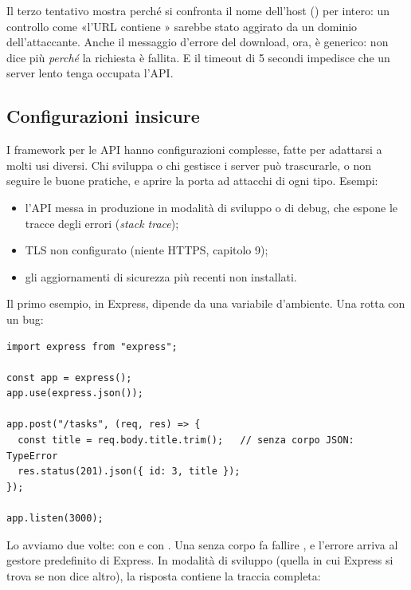 Il terzo tentativo mostra perché si confronta il nome dell'host
() per intero: un controllo come «l'URL contiene
» sarebbe stato aggirato da un dominio dell'attaccante.
Anche il messaggio d'errore del download, ora, è generico: non dice più
\textit{perché} la richiesta è fallita. E il timeout di 5 secondi impedisce che
un server lento tenga occupata l'API.

\subsection{Configurazioni insicure}

I framework per le API hanno configurazioni complesse, fatte per adattarsi a
molti usi diversi. Chi sviluppa o chi gestisce i server può trascurarle, o non
seguire le buone pratiche, e aprire la porta ad attacchi di ogni tipo. Esempi:

\begin{itemize}
  \item l'API messa in produzione in modalità di sviluppo o di debug, che
        espone le tracce degli errori (\textit{stack trace});
  \item TLS non configurato (niente HTTPS, capitolo 9);
  \item gli aggiornamenti di sicurezza più recenti non installati.
\end{itemize}

Il primo esempio, in Express, dipende da una variabile d'ambiente. Una rotta
con un bug:

\begin{lstlisting}[style=js, name=errori1.js]
import express from "express";

const app = express();
app.use(express.json());

app.post("/tasks", (req, res) => {
  const title = req.body.title.trim();   // senza corpo JSON: TypeError
  res.status(201).json({ id: 3, title });
});

app.listen(3000);
\end{lstlisting}

Lo avviamo due volte: con  e con
. Una  senza corpo fa
fallire , e l'errore arriva al gestore predefinito di
Express. In modalità di sviluppo (quella in cui Express si trova se
 non dice altro), la risposta contiene la traccia completa:

